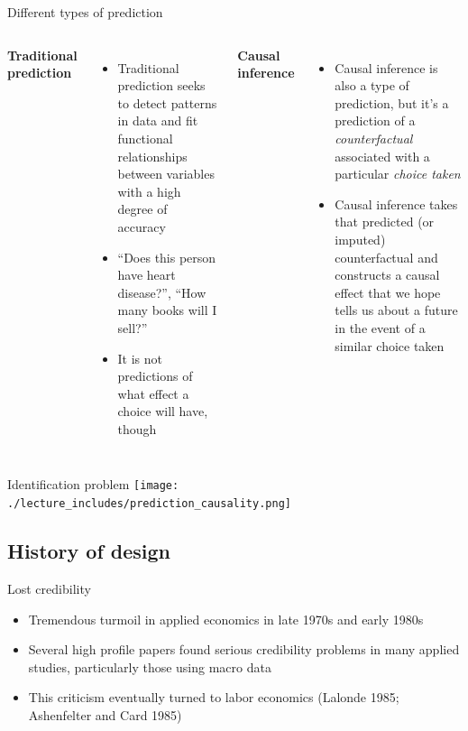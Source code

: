 \documentclass{beamer}
\begin{document}
\begin{frame}{Different types of prediction}

  \begin{columns}
    \centering
    \textbf{Traditional prediction}
    \begin{itemize}
      \item Traditional prediction seeks to detect patterns in data and fit functional relationships between variables with a high degree of accuracy
      \item ``Does this person have heart disease?'', ``How many books will I sell?''
      \item It is not predictions of what effect a choice will have, though
    \end{itemize}
    \centering
    \textbf{Causal inference}
    \begin{itemize}
      \item Causal inference is also a type of prediction, but it's a prediction of a \emph{counterfactual} associated with a particular \emph{choice taken}
      \item Causal inference takes that predicted (or imputed) counterfactual and constructs a causal effect that we hope tells us about a future in the event of a similar choice taken
    \end{itemize}
  \end{columns}
\end{frame}


\begin{frame}{Identification problem}
  \centering
  \texttt{[image: ./lecture\_includes/prediction\_causality.png]}
\end{frame}



\subsection{History of design}



\begin{frame}{Lost credibility}

  \begin{itemize}
  \item Tremendous turmoil in applied economics in late 1970s and early 1980s
  \item Several high profile papers found serious credibility problems in many applied studies, particularly those using macro data
  \item This criticism eventually turned to labor economics (Lalonde 1985; Ashenfelter and Card 1985)
  \end{itemize}

\end{frame}
\end{document}
